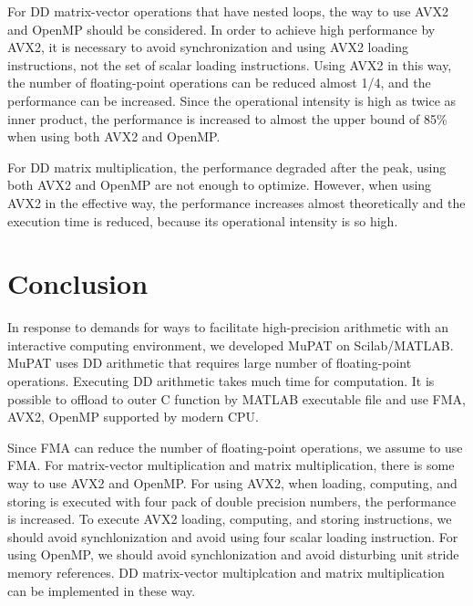 \documentclass{IOS-Book-Article}
\begin{document}
For DD matrix-vector operations that have nested loops, the way to use AVX2 and OpenMP should be considered. In order to achieve high performance by AVX2, it is necessary to avoid synchronization and using AVX2 loading instructions, not the set of scalar loading instructions. Using AVX2 in this way, the number of floating-point operations can be reduced almost 1/4, and the performance can be increased. Since the operational intensity is high as twice as inner product, the performance is increased to almost the upper bound of 85\% when using both AVX2 and OpenMP. 

For DD matrix multiplication, the performance degraded after the peak, using both AVX2 and OpenMP are not enough to optimize. However, when using AVX2 in the effective way, the performance increases almost theoretically and the execution time is reduced, because its operational intensity is so high.

\section{Conclusion}
In response to demands for ways to facilitate high-precision arithmetic with an interactive computing environment, we developed MuPAT on Scilab/MATLAB. MuPAT uses DD arithmetic that requires large number of floating-point operations. Executing DD arithmetic takes much time for computation. It is possible to offload to outer C function by MATLAB executable file and use FMA, AVX2, OpenMP supported by modern CPU. 

Since FMA can reduce the number of floating-point operations, we assume to use FMA.  
For matrix-vector multiplication and matrix multiplication, there is some way to use AVX2 and OpenMP. 
For using AVX2, when loading, computing, and storing is executed with four pack of double precision numbers, the performance is increased. 
To execute AVX2 loading, computing, and storing instructions, we should avoid synchlonization and avoid using four scalar loading instruction. 
For using OpenMP, we should avoid synchlonization and avoid disturbing unit stride memory references.
DD matrix-vector multiplcation and matrix multiplication can be implemented in these way. 
\end{document}
